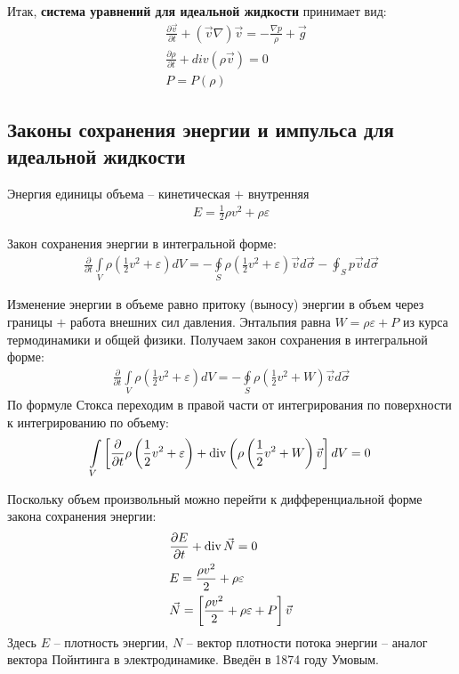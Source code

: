 Итак, \textbf{система уравнений для идеальной жидкости} принимает вид:
\begin{align*}
& \frac { \partial \vec { v } } { \partial t } + ( \vec { v } \nabla ) \vec { v } = - \frac { \nabla p } { \rho } + \vec { g } \\
& \frac { \partial \rho } { \partial t } + d i v ( \rho \vec { v } ) = 0 \\
& P = P ( \rho )
\end{align*}
\subsection{Законы сохранения энергии и импульса для идеальной жидкости}

Энергия единицы объема – кинетическая $+$ внутренняя
\begin{align*}
E = \frac { 1 } { 2 } \rho v ^ { 2 } + \rho \varepsilon
\end{align*}

Закон сохранения энергии в интегральной форме:
\begin{align*}
\frac { \partial } { \partial t } \int\limits_{ V } \rho \left( \frac { 1 } { 2 } v ^ { 2 } + \varepsilon \right) d V = - \oint\limits_{ S } \rho \left( \frac { 1 } { 2 } v ^ { 2 } + \varepsilon \right) \vec { v } d \vec { \sigma } - \oint _ { S } p \vec { v } d \vec { \sigma }
\end{align*}

Изменение энергии в объеме равно притоку (выносу) энергии в объем через границы $+$ работа внешних сил давления. Энтальпия равна $ W = \rho \varepsilon + P $ из курса термодинамики и общей физики. Получаем закон сохранения в интегральной форме:
\begin{align*}
\frac { \partial } { \partial t } \int \limits_{ V } \rho \left( \frac { 1 } { 2 } v ^ { 2 } + \varepsilon \right) d V = - \oint \limits_{ S } \rho \left( \frac { 1 } { 2 } v ^ { 2 } + W \right) \vec { v } d \vec { \sigma }
\end{align*}
По формуле Стокса переходим в правой части от интегрирования по поверхности к интегрированию по объему:
\begin{align*}
\int \limits_ { V } \left[ \frac { \partial } { \partial t } \rho \left( \frac { 1 } { 2 } v ^ { 2 } + \varepsilon \right) + \operatorname{div} \left( \rho \left( \frac { 1 } { 2 } v ^ { 2 } + W \right) \vec { v } \right] d V = 0\right.
\end{align*}

Поскольку объем произвольный можно перейти к дифференциальной  форме закона сохранения энергии:
\begin{align*}
& \frac { \partial E } { \partial t } + \operatorname{div} \vec { N } = 0 \\
& E = \frac { \rho v ^ { 2 } } { 2 } + \rho \varepsilon \\
& \vec { N } = \left[ \frac { \rho v ^ { 2 } } { 2 } + \rho \varepsilon + P \right] \vec { v }
\end{align*}
Здесь $E$ – плотность энергии, $N$ – вектор плотности потока энергии – аналог вектора Пойнтинга в электродинамике. Введён в 1874 году Умовым.

